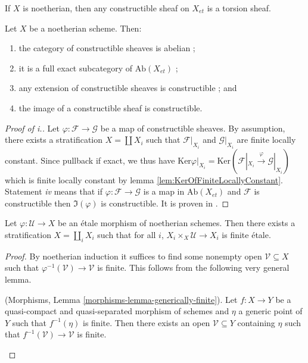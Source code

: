 \begin{remark} 
If $X$ is noetherian, then any constructible sheaf on $X_{et}$ is a torsion 
sheaf. 
\end{remark}

\begin{lemma}
Let $X$ be a noetherian scheme. Then: 
\begin{enumerate}
\item 
the category of constructible sheaves is abelian ;
\item 
it is a full exact subcategory of $\text{Ab}(X_{et})$ ;
\item 
any extension of constructible sheaves is constructible ; and
\item 
the image of a constructible sheaf is constructible.
\end{enumerate}
\end{lemma} 

\begin{proof}[Proof of i.]
Let $\varphi: \mathcal{F} \to \mathcal{G}$ be a map of constructible sheaves. 
By assumption, there exists a stratification $X = \coprod X_i$ such that 
$\mathcal{F}|_{X_i}$ and $\mathcal{G}|_{X_i}$ are finite locally constant. 
Since pullback if exact, we thus have $\text{Ker} \varphi|_{X_i} = \text{Ker} 
(\mathcal{F}|_{X_i}\xrightarrow{\varphi} \mathcal{G}|_{X_i})$ which is finite 
locally constant by lemma \ref{lem:KerOfFiniteLocallyConstant}. Statement {\it 
iv} means that if $\varphi :\mathcal{F}\to\mathcal{G}$ is a map in 
$\text{Ab}(X_{et})$ and $\mathcal{F}$ is constructible then $\Im(\varphi)$ is 
constructible. It is proven in \cite{SGA4.5}.
\end{proof}

\begin{lemma} \label{lem:EtaleRefinesToFiniteEtale}
Let $\varphi: \mathcal{U} \to X$ be an \'etale morphism of noetherian schemes. 
Then there exists a stratification $X=\coprod_i X_i$ such that for all $i$, 
$X_i\times_X \mathcal{U} \to X_i$ is finite \'etale. 
\end{lemma}

\begin{proof} 
By noetherian induction it suffices to find some nonempty open 
$\mathcal{V}\subseteq X$ such that $\varphi^{-1}(\mathcal{V})\to \mathcal{V}$ 
is finite. This follows from the following very general lemma.
\begin{lemma}
(Morphisms, Lemma \ref{morphisms-lemma-generically-finite}).
Let $f: X\to Y$ be a quasi-compact and quasi-separated morphism of schemes and 
$\eta$ a generic point of $Y$ such that $f^{-1}(\eta)$ is finite. Then there 
exists an open $\mathcal{V} \subseteq Y$ containing $\eta$ such that 
$f^{-1}(\mathcal{V})\to \mathcal{V}$ is finite.
\end{lemma}
\end{proof}

